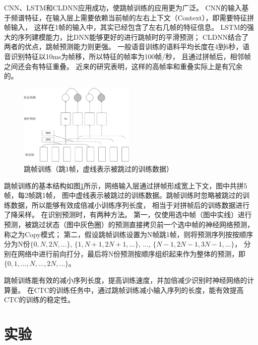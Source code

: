 CNN、LSTM和CLDNN应用成功，使跳帧训练的应用更为广泛。
CNN的输入基于频谱特征，在输入层上需要依赖当前帧的左右上下文（Context），即需要特征拼帧输入，
这样在1帧的输入中，其实已经包含了左右几帧的特征信息。
LSTM的强大的序列建模能力，比DNN能够更好的进行跳帧时的平滑预测；
CLDNN结合了两者的优点，跳帧预测能力则更强。
一般语音训练的语料平均长度在4到6秒，语音识别特征以10ms为帧移，所以特征的帧率为100帧/秒，
且通过拼帧后，相邻帧之间还会有特征重叠。
近来的研究表明，这样的高帧率和重叠实际上是有冗余的。

\begin{figure}
\centering
\includegraphics[width=0.5\textwidth]{figures/chapter3/skip-crop}
\caption{跳帧训练（跳1帧，虚线表示被跳过的训练数据）}
\label{fig:skip}
\end{figure}


跳帧训练的基本结构如图\ref{fig:skip}所示，网络输入层通过拼帧形成宽上下文，图中共拼5帧，每2帧跳1帧，
图中虚线表示被跳过的训练数据。跳帧训练时忽略被跳过的训练数据，所以能够有效成倍减小训练序列长度，
相当于对拼帧后的训练数据进行了降采样。
在识别预测时，有两种方法。
第一，仅使用选中帧（图中实线）进行预测，被跳过状态（图中灰色圈）的预测直接拷贝前一个选中帧的神经网络预测，称之为Copy模式；
第二，假设跳帧训练设置为N帧跳1帧，则将预测序列按按顺序分为N份$\{0, N, 2N, ...\}$, $\{1, N+1, 2N+1, ...\}$, ..., $\{N-1, 2N-1, 3N-1, ...\}$，
分别在网络中进行前向打分，最后将N份预测按顺序组织起来作为整体的预测，即$\{0, 1, ..., N, ..., 2N, ...\}$。


跳帧训练能有效的减小序列长度，提高训练速度，并加倍减少识别时神经网络的计算量。
在CTC的训练任务中，通过跳帧训练减小输入序列的长度，能有效提高CTC的训练的稳定性。

\section{实验} 